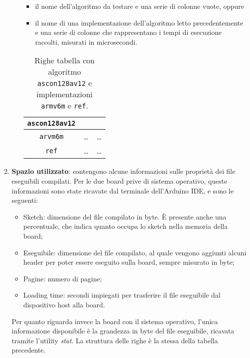 \begin{enumerate}[label=\Roman*.]
\begin{itemize}
            \begin{itemize}
                \item il nome dell'algoritmo da testare e una serie di colonne vuote, oppure
                \item il nome di una implementazione dell'algoritmo letto precedentemente e una serie di colonne che rappresentano i tempi di esecuzione raccolti, misurati in microsecondi.
            \end{itemize}
            \begin{table}[H]
                \centering
            	\begin{tabular}{|c|c|c|}
            		\hline
                    \texttt{ascon128av12} & & \\
                    \hline
                    \texttt{arvm6m} & \dots & \dots \\
                    \hline
                    \texttt{ref} & \dots & \dots \\
            		\hline
                \end{tabular}
                \caption{Righe tabella con algoritmo \texttt{ascon128av12} e implementazioni \texttt{armv6m} e \texttt{ref}.}
            \end{table}
    \end{itemize}
    \item \textbf{Spazio utilizzato}: contengono alcune informazioni sulle proprietà dei file eseguibili compilati. Per le due board prive di sistema operativo, queste informazioni sono state ricavate dal terminale dell'Arduino IDE, e sono le seguenti:
    \begin{itemize}
        \item Sketch: dimensione del file compilato in byte. È presente anche una percentuale, che indica quanto occupa lo sketch nella memoria della board;
        \item Eseguibile: dimensione del file compilato, al quale vengono aggiunti alcuni header per poter essere eseguito sulla board, sempre misurato in byte;
        \item Pagine: numero di pagine;
        \item Loading time: secondi impiegati per trasferire il file eseguibile dal dispositivo host alla board.
    \end{itemize}
    Per quanto riguarda invece la board con il sistema operativo, l'unica informazione disponibile è la grandezza in byte del file eseguibile, ricavata tramite l'utility \textit{stat}. La struttura delle righe è la stessa della tabella precedente.
\end{enumerate}


